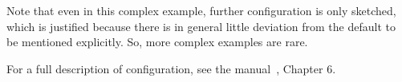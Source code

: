 \documentclass[a4paper,notumble,10pt,english]{leaflet}%
\begin{document}
Note that even in this complex example, 
further configuration is only sketched, 
which is justified because 
there is in general little deviation from the default 
to be mentioned explicitly. 
So, more complex examples are rare. 

For a full description of configuration, 
see the manual~\cite{LatexPlugin}, Chapter 6. 




\end{document}
